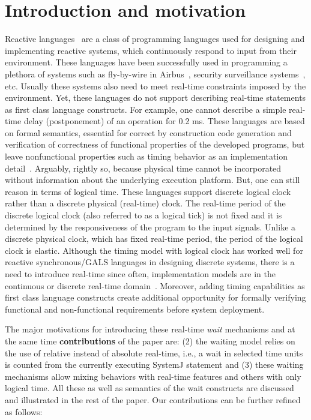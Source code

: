 \section{Introduction and motivation}
\label{sec:intr-motiv}

Reactive languages~\cite{gber931,amal10} are a class of programming
languages used for designing and implementing reactive systems, which
continuously respond to input from their environment. These languages
have been successfully used in programming a plethora of systems such as
fly-by-wire in Airbus~\cite{eairbus}, security surveillance
systems~\cite{amal121}, etc. Usually these systems also need to meet
real-time constraints imposed by the environment. Yet, these languages
do not support describing real-time statements as first class language
constructs.  For example, one cannot describe a simple real-time delay
(postponement) of an operation for 0.2 ms. These languages are based on
formal semantics, essential for correct by construction code generation
and verification of correctness of functional properties of the
developed programs, but leave nonfunctional properties such as timing
behavior as an implementation detail~\cite{boldt07}. Arguably, rightly
so, because physical time cannot be incorporated without information
about the underlying execution platform.  But, one can still reason in
terms of logical time. These languages support discrete logical clock
rather than a discrete physical (real-time) clock. The real-time period
of the discrete logical clock (also referred to as a logical tick) is
not fixed and it is determined by the responsiveness of the program to
the input signals. Unlike a discrete physical clock, which has fixed
real-time period, the period of the logical clock is elastic. Although
the timing model with logical clock has worked well for reactive
synchronous/GALS languages in designing discrete systems, there is a
need to introduce real-time since often, implementation models are in
the continuous or discrete real-time
domain~\cite{DBLP:journals/pieee/SifakisTY03}.  Moreover, adding timing
capabilities as first class language constructs create additional
opportunity for formally verifying functional and non-functional
requirements before system deployment.



The major motivations for introducing these real-time \textit{wait}
mechanisms and at the same time \textbf{contributions} of the paper are:
 (2) the waiting model
relies on the use of relative instead of absolute real-time, i.e., a
wait in selected time units is counted from the currently executing
SystemJ statement and (3) these waiting mechanisms allow mixing
behaviors with real-time features and others with only logical time. All
these as well as semantics of the wait constructs are discussed and
illustrated in the rest of the paper. Our contributions can be further
refined as follows:

